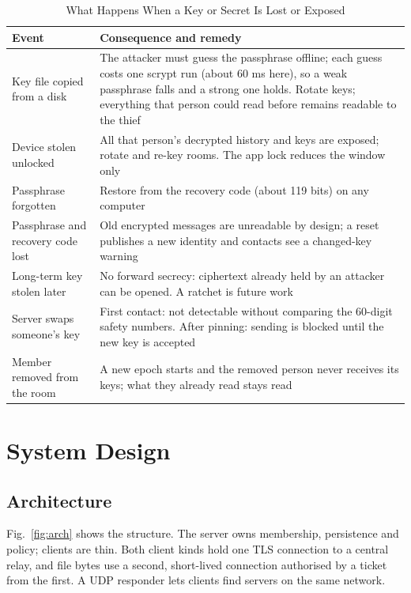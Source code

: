 \documentclass[conference]{IEEEtran}
\begin{document}
\begin{table}[t]
\centering
\caption{What Happens When a Key or Secret Is Lost or Exposed}
\label{tab:compromise}
\scriptsize
\begin{tabularx}{\columnwidth}{@{}>{\raggedright\arraybackslash}p{2.2cm} Y@{}}
\toprule
\textbf{Event} & \textbf{Consequence and remedy} \\
\midrule
Key file copied from a disk & The attacker must guess the passphrase offline; each guess costs one scrypt run (about 60 ms here), so a weak passphrase falls and a strong one holds. Rotate keys; everything that person could read before remains readable to the thief \\
Device stolen unlocked & All that person's decrypted history and keys are exposed; rotate and re-key rooms. The app lock reduces the window only \\
Passphrase forgotten & Restore from the recovery code (about 119 bits) on any computer \\
Passphrase and recovery code lost & Old encrypted messages are unreadable by design; a reset publishes a new identity and contacts see a changed-key warning \\
Long-term key stolen later & No forward secrecy: ciphertext already held by an attacker can be opened. A ratchet is future work \\
Server swaps someone's key & First contact: not detectable without comparing the 60-digit safety numbers. After pinning: sending is blocked until the new key is accepted \\
Member removed from the room & A new epoch starts and the removed person never receives its keys; what they already read stays read \\
\bottomrule
\end{tabularx}
\end{table}

\section{System Design}\label{sec:design}
\subsection{Architecture}
Fig.~\ref{fig:arch} shows the structure. The server owns membership, persistence and policy; clients are thin. Both client kinds hold one TLS connection to a central relay, and file bytes use a second, short-lived connection authorised by a ticket from the first. A UDP responder lets clients find servers on the same network.
\end{document}
